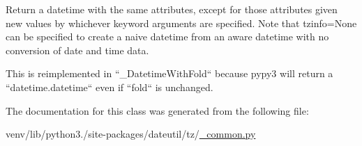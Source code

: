 \begin{DoxyVerb}Return a datetime with the same attributes, except for those
attributes given new values by whichever keyword arguments are
specified. Note that tzinfo=None can be specified to create a naive
datetime from an aware datetime with no conversion of date and time
data.

This is reimplemented in ``_DatetimeWithFold`` because pypy3 will
return a ``datetime.datetime`` even if ``fold`` is unchanged.
\end{DoxyVerb}
 

The documentation for this class was generated from the following file\+:\begin{DoxyCompactItemize}
\item 
venv/lib/python3./site-\/packages/dateutil/tz/\hyperlink{tz_2__common_8py}{\+\_\+common.\+py}\end{DoxyCompactItemize}
